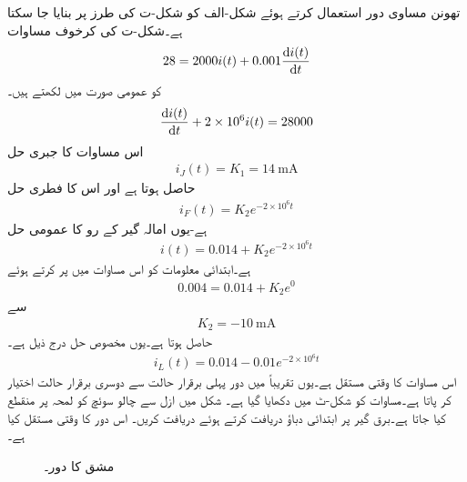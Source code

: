 تھونن مساوی دور استعمال کرتے ہوئے شکل-الف کو شکل-ت کی طرز پر بنایا جا سکتا ہے۔شکل-ت کی کرخوف مساوات
\begin{align*}
28=2000 i(t)+0.001 \frac{\dif i(t)}{\dif t}
\end{align*}
کو عمومی صورت میں لکھتے ہیں۔
\begin{align*}
\frac{\dif i(t)}{\dif t}+2\times 10^6 i(t)=28000
\end{align*}
اس مساوات کا جبری حل 
\begin{align*}
i_J(t)=K_1=\SI{14}{\milli\ampere}
\end{align*}
حاصل ہوتا ہے اور اس کا فطری حل
\begin{align*}
i_F(t)=K_2 e^{-2\times 10^6 t}
\end{align*}
ہے-یوں امالہ گیر کے رو کا عمومی حل
\begin{align*}
i(t)=0.014+K_2 e^{-2\times 10^6 t}
\end{align*}
ہے۔ابتدائی معلومات کو اس مساوات میں پر کرتے ہوئے
\begin{align*}
0.004=0.014+K_2 e^{0}
\end{align*}
سے
\begin{align*}
K_2=\SI{-10}{\milli\ampere}
\end{align*}
حاصل ہوتا ہے۔یوں مخصوص حل درج ذیل ہے۔
\begin{align}\label{مساوات_عارضی_امالہ_گیر_مکمل_حل_ب}
i_L(t)=0.014-0.01e^{-2\times 10^6 t}
\end{align} 
اس مساوات کا وقتی مستقل  ہے۔یوں تقریباً  میں دور پہلی برقرار حالت سے دوسری برقرار حالت اختیار کر پاتا ہے۔مساوات  کو شکل-ٹ میں دکھایا گیا ہے۔
شکل  میں ازل سے چالو سوئچ کو  لمحہ  پر منقطع کیا جاتا ہے۔برق گیر پر ابتدائی دباؤ دریافت کرتے ہوئے  دریافت کریں۔ اس دور کا وقتی مستقل کیا ہے۔
\begin{figure}
\centering
{}
\caption{مشق  کا دور۔}
\label{شکل_عارضی_مشق_برق_گیر_الف}
\end{figure}

